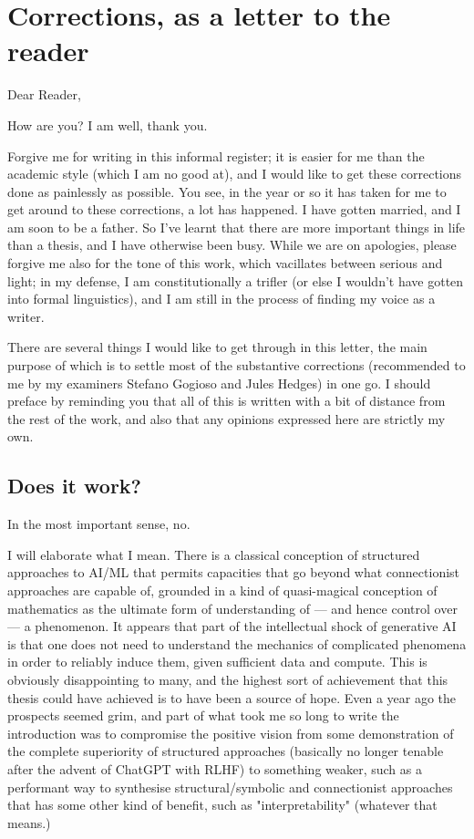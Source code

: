 \chapter{Corrections, as a letter to the reader}

Dear Reader,

How are you? I am well, thank you.

Forgive me for writing in this informal register; it is easier for me than the academic style (which I am no good at), and I would like to get these corrections done as painlessly as possible. You see, in the year or so it has taken for me to get around to these corrections, a lot has happened. I have gotten married, and I am soon to be a father. So I've learnt that there are more important things in life than a thesis, and I have otherwise been busy. While we are on apologies, please forgive me also for the tone of this work, which vacillates between serious and light; in my defense, I am constitutionally a trifler \cite{} (or else I wouldn't have gotten into formal linguistics), and I am still in the process of finding my voice as a writer.

There are several things I would like to get through in this letter, the main purpose of which is to settle most of the substantive corrections (recommended to me by my examiners Stefano Gogioso and Jules Hedges) in one go. I should preface by reminding you that all of this is written with a bit of distance from the rest of the work, and also that any opinions expressed here are strictly my own.

\section{Does it work?}

In the most important sense, no.

I will elaborate what I mean. There is a classical conception of structured approaches to AI/ML that permits capacities that go beyond what connectionist approaches are capable of, grounded in a kind of quasi-magical conception of mathematics as the ultimate form of understanding of --- and hence control over --- a phenomenon. It appears that part of the intellectual shock of generative AI is that one does not need to understand the mechanics of complicated phenomena in order to reliably induce them, given sufficient data and compute. This is obviously disappointing to many, and the highest sort of achievement that this thesis could have achieved is to have been a source of hope. Even a year ago the prospects seemed grim, and part of what took me so long to write the introduction was to compromise the positive vision from some demonstration of the complete superiority of structured approaches (basically no longer tenable after the advent of ChatGPT with RLHF) to something weaker, such as a performant way to synthesise structural/symbolic and connectionist approaches that has some other kind of benefit, such as "interpretability" (whatever that means.)

